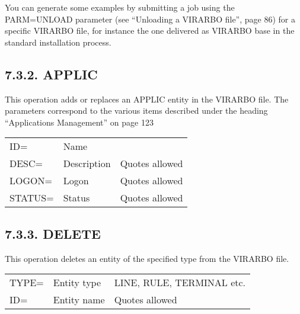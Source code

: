 \documentclass[letterpaper,10pt,english]{sphinxmanual}
\begin{document}
You can generate some examples by submitting a job using the PARM=UNLOAD parameter (see “Unloading a VIRARBO file”, page 86) for a specific VIRARBO file, for instance the one delivered as VIRARBO base in the standard installation process.


\subsection{7.3.2. APPLIC}
\label{\detokenize{Installation_Guide:applic}}
This operation adds or replaces an APPLIC entity in the VIRARBO file. The parameters correspond to the various items
described under the heading “Applications Management” on page 123


\begin{savenotes}\sphinxattablestart
\centering
\begin{tabulary}{\linewidth}[t]{|T|T|T|}
\hline
{}\relax &\relax &\relax \\
\hline
ID=
&
Name
&\\
\hline
DESC=
&
Description
&
Quotes allowed
\\
\hline
LOGON=
&
Logon
&
Quotes allowed
\\
\hline
STATUS=
&
Status
&
Quotes allowed
\\
\hline
\end{tabulary}
\par
\sphinxattableend\end{savenotes}


\subsection{7.3.3. DELETE}
\label{\detokenize{Installation_Guide:delete}}
This operation deletes an entity of the specified type from the VIRARBO file.


\begin{savenotes}\sphinxattablestart
\centering
\begin{tabulary}{\linewidth}[t]{|T|T|T|}
\hline
{}\relax &\relax &\relax \\
\hline
TYPE=
&
Entity type
&
LINE, RULE, TERMINAL etc.
\\
\hline
ID=
&
Entity name
&
Quotes allowed
\\
\hline
\end{tabulary}
\par
\sphinxattableend\end{savenotes}
\end{document}
